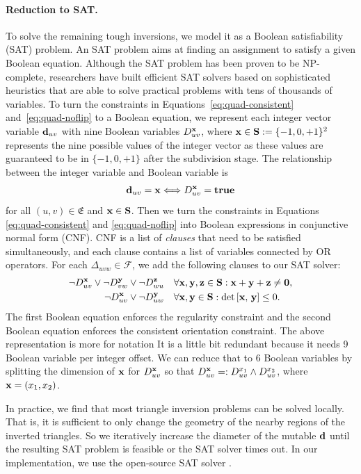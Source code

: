 \paragraph*{Reduction to SAT.}
To solve the remaining tough inversions,  we model it as a Boolean satisfiability (SAT) problem.  An SAT problem aims at finding an assignment to satisfy a given Boolean equation.  Although the SAT problem has been proven to be NP-complete, researchers have built efficient SAT solvers based on sophisticated heuristics that are able to solve practical problems with tens of thousands of variables.  To turn the constraints in Equations~\eqref{eq:quad-consistent} and~\eqref{eq:quad-noflip} to a Boolean equation, we represent each integer vector variable ${\mathbf{d}}_{uv}$ with nine Boolean variables $D^{\mathbf{x}}_{uv}$, where $\mathbf{x} \in \mathbf{S} := \{-1, 0, +1\}^2$ represents the nine possible values of the integer vector as these values are guaranteed to be in $\{-1, 0, +1\}$ after the subdivision stage.  The relationship between the integer variable and Boolean variable is
\[
{\mathbf{d}}_{uv}=\mathbf{x} \Longleftrightarrow D^{\mathbf{x}}_{uv}= \mathbf{true}
\]
for all $(u,v)\in\mathfrak{E}$ and $\mathbf{x} \in \mathbf{S}$.  Then we turn the constraints in Equations \eqref{eq:quad-consistent} and \eqref{eq:quad-noflip} into Boolean expressions in conjunctive normal form (CNF). CNF is a list of \emph{clauses} that need to be satisfied simultaneously, and each clause contains a list of variables connected by OR operators.  For each $\Delta_{uvw} \in \mathcal{F}$, we add the following clauses to our SAT solver: 
\begin{align*}
\lnot D^{\mathbf{x}}_{uv} \lor \lnot D^{\mathbf{y}}_{vw} \lor \lnot D^{\mathbf{z}}_{wu} \quad &\forall \mathbf{x},\mathbf{y},\mathbf{z}\in {\mathbf{S}}:\mathbf{x}+\mathbf{y}+\mathbf{z}\ne \mathbf{0}, \\
\lnot D^{\mathbf{x}}_{uv} \lor \lnot D^{\mathbf{y}}_{uw} \quad &\forall \mathbf{x},\mathbf{y}\in {\mathbf{S}}: \mathrm{det} \left[ \mathbf{x},\, \mathbf{y} \right] \le 0.
\end{align*}
The first Boolean equation enforces the regularity constraint and the second Boolean equation enforces the consistent orientation constraint.  The above representation is more for notation It is a little bit redundant because it needs 9 Boolean variable per integer offset.  We can reduce that to 6 Boolean variables by splitting the dimension of $\mathbf{x}$ for $D^{\mathbf{x}}_{uv}$ so that $D^{\mathbf{x}}_{uv}=:D^{x_1}_{uv}\land D^{x_2}_{uv}$, where $\mathbf{x}=(x_1, x_2)$.

In practice, we find that most triangle inversion problems can be solved locally. That is, it is sufficient to only change the geometry of the nearby regions of the inverted triangles.  So we iteratively increase the diameter of the mutable ${\mathbf{d}}$ until the resulting SAT problem is feasible or the SAT solver times out.  In our implementation, we use the open-source SAT solver \cite{liang2016learning}.  %

